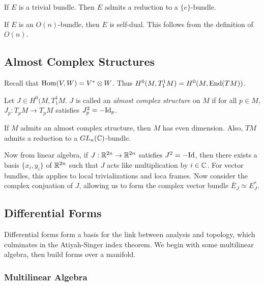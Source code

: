 \documentclass[twoside, 10pt]{article}
\begin{document}
    \begin{exm}
        If $E$ is a trivial bundle. Then $E$ admits a reduction to a $\{e\}$-bundle.
    \end{exm}

    \begin{exm}
        If $E$ is an $O(n)$-bundle, then $E$ is self-dual. This follows from the definition of $O(n)$.
    \end{exm}

    \subsection{Almost Complex Structures}%
    \label{sec:symplectic_manifolds}

    Recall that $\operatorname{Hom}(V,W) = V^* \otimes W$. Thus $H^0(M, T_1^1M) = H^0(M,\operatorname{End}(TM))$.

    \begin{defn}
        Let $J \in H^0(M, T_1^1M$. $J$ is called an \textit{almost complex structure} on $M$ if for all $p \in M$, $J_p: T_pM \to T_pM$ satisfies $J_p^2 = -\mathrm{Id}_p$.
    \end{defn}

    \begin{prop}
        If $M$ admits an almost complex structure, then $M$ has even dimension. Also, $TM$ admits a reduction to a $GL_n(\mathbb{C})$-bundle.
    \end{prop}

    Now from linear algebra, if $J:\mathbb{R}^{2n} \to \mathbb{R}^{2n}$ satisfies $J^2 = -\mathrm{Id}$, then there exists a basis $\{x_i,y_i\}$ of $\mathbb{R}^{2n}$ such that $J$ acts like multiplication by $i \in \mathbb{C}$. For vector bundles, this applies to local trivializations and loca frames. Now consider the complex conjuation of $J$, allowing us to form the complex vector bundle $\overline{E}_J \simeq E_J^*$.

    \subsection{Differential Forms}%
    \label{sub:differential_forms}

    Differential forms form a basis for the link between analysis and topology, which culminates in the Atiyah-Singer index theorem. We begin with some multilinear algebra, then build forms over a manifold.

    \subsubsection{Multilinear Algebra}%
    \label{ssub:multilinear_algebra}
\end{document}
